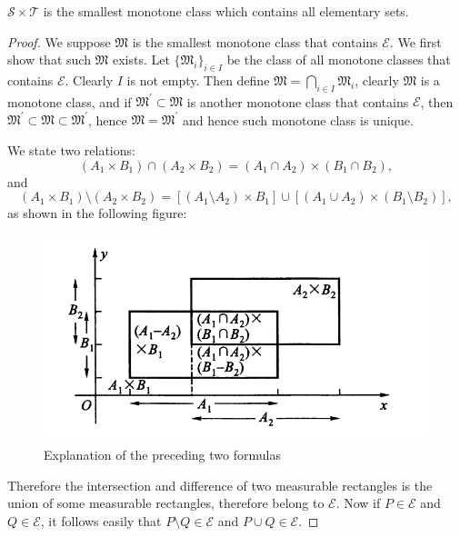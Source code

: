 \begin{theorem}
$\mathscr{S}\times\mathscr{T}$ is the smallest monotone class which contains all elementary sets.
\end{theorem}
\begin{proof}
We suppose $\mathfrak{M}$ is the smallest monotone class that contains $\mathscr{E}$. We first show that such $\mathfrak{M}$ exists. Let $\{\mathfrak{M}_i\}_{i\in I}$ be the class of all monotone classes that contains $\mathscr{E}$. Clearly $I$ is not empty. Then define $\mathfrak{M}=\bigcap_{i\in I}\mathfrak{M}_i$, clearly $\mathfrak{M}$ is a monotone class, and if $\mathfrak{M}^\prime\subset\mathfrak{M}$ is another monotone class that contains $\mathscr{E}$, then $\mathfrak{M}^\prime\subset\mathfrak{M}\subset\mathfrak{M}^\prime$, hence $\mathfrak{M}=\mathfrak{M}^\prime$ and hence such monotone class is unique.\par
We state two relations: 
$$
\left( A_1\times B_1 \right) \cap \left( A_2\times B_2 \right) =\left( A_1\cap A_2 \right) \times \left( B_1\cap B_2 \right) ,
$$
and 
$$
\left( A_1\times B_1 \right) \setminus \left( A_2\times B_2 \right) =\left[ \left( A_1\setminus A_2 \right) \times B_1 \right] \cup \left[ \left( A_1\cup A_2 \right) \times \left( B_1\setminus B_2 \right) \right] ,
$$
as shown in the following figure:\par
\begin{figure}[htbp]
    \center
    \includegraphics[scale=0.39]{img/rectangle intersection.png}
    \caption{Explanation of the preceding two formulas}
\end{figure}
Therefore the intersection and difference of two measurable rectangles is the union of some measurable rectangles, therefore belong to $\mathscr{E}$. Now if $P\in\mathscr{E}$ and $Q\in\mathscr{E}$, it follows easily that $P\setminus Q\in\mathscr{E}$ and $P\cup Q\in\mathscr{E}$.\par

\end{proof}
